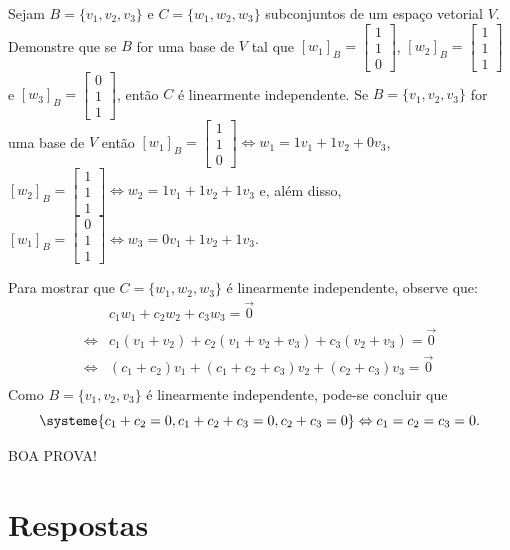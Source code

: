 \documentclass[12pt,a4paper]{article}
\begin{document}
\begin{ExerciseList}
\Exercise[title={2,0}] Sejam $B = \{v_1, v_2, v_3\}$ e $C = \{ w_1, w_2, w_3 \}$ subconjuntos de um espaço vetorial $V$. Demonstre que se $B$ for uma base de $V$ tal que
$[w_1]_B =
\begin{bmatrix}
1 \\ 1 \\ 0
\end{bmatrix}$,
$[w_2]_B =
\begin{bmatrix}
1 \\ 1 \\ 1
\end{bmatrix}$ e
$[w_3]_B =
\begin{bmatrix}
0 \\ 1 \\ 1
\end{bmatrix}$, então $C$ é linearmente independente.
\Answer
Se $B = \{v_1, v_2, v_3\}$ for uma base de $V$ então
$[w_1]_B =
\begin{bmatrix}
1 \\ 1 \\ 0
\end{bmatrix}
\Leftrightarrow
w_1 = 1 v_1 + 1 v_2 + 0 v_3$,
$[w_2]_B =
\begin{bmatrix}
1 \\ 1 \\ 1
\end{bmatrix}
\Leftrightarrow
w_2 = 1 v_1 + 1 v_2 + 1 v_3$ e, além disso,
$[w_1]_B =
\begin{bmatrix}
0 \\ 1 \\ 1
\end{bmatrix}
\Leftrightarrow
w_3 = 0 v_1 + 1 v_2 + 1 v_3$.

Para mostrar que $C = \{ w_1, w_2, w_3 \}$ é linearmente independente, observe que:
\begin{align*}
&c_1 w_1 + c_2 w_2 + c_3 w_3 = \vec{0}\\
\Leftrightarrow
&c_1 (v_1 + v_2) + c_2 (v_1 + v_2 + v_3) + c_3 (v_2 + v_3) = \vec{0}\\
\Leftrightarrow
&(c_1 +c_2)v_1 + (c_1+c_2+c_3)v_2 + (c_2+c_3) v_3 = \vec{0}\\
\end{align*}
Como $B = \{v_1, v_2, v_3\}$ é linearmente independente, pode-se concluir que
\[
\systeme{
c_1 + c_2 = 0,
c_1 + c_2 + c_3=0,
c_2 + c_3 = 0
}
\Leftrightarrow
c_1 = c_2 = c_3 = 0.
\]

\end{ExerciseList}

\vfill
\begin{center}
BOA PROVA!
\end{center}

\newpage
\restoregeometry
\section*{Respostas}
\shipoutAnswer
\end{document}
